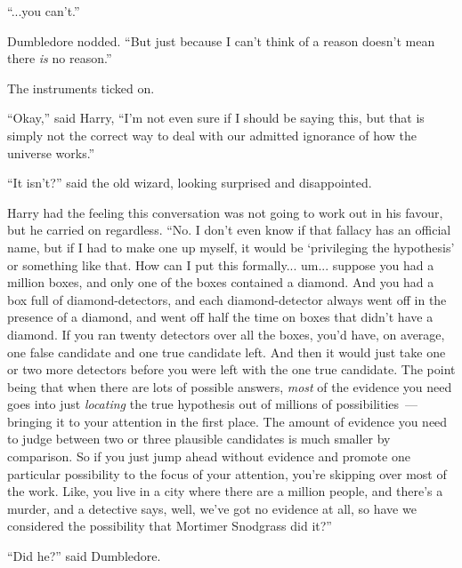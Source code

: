 ``...you can't.''

Dumbledore nodded. ``But just because I can't think of a reason doesn't mean there \emph{is} no reason.''

The instruments ticked on.

``Okay,'' said Harry, ``I'm not even sure if I should be saying this, but that is simply not the correct way to deal with our admitted ignorance of how the universe works.''

``It isn't?'' said the old wizard, looking surprised and disappointed.

Harry had the feeling this conversation was not going to work out in his favour, but he carried on regardless. ``No. I don't even know if that fallacy has an official name, but if I had to make one up myself, it would be `privileging the hypothesis' or something like that. How can I put this formally... um... suppose you had a million boxes, and only one of the boxes contained a diamond. And you had a box full of diamond-detectors, and each diamond-detector always went off in the presence of a diamond, and went off half the time on boxes that didn't have a diamond. If you ran twenty detectors over all the boxes, you'd have, on average, one false candidate and one true candidate left. And then it would just take one or two more detectors before you were left with the one true candidate. The point being that when there are lots of possible answers, \emph{most} of the evidence you need goes into just \emph{locating} the true hypothesis out of millions of possibilities~--- bringing it to your attention in the first place. The amount of evidence you need to judge between two or three plausible candidates is much smaller by comparison. So if you just jump ahead without evidence and promote one particular possibility to the focus of your attention, you're skipping over most of the work. Like, you live in a city where there are a million people, and there's a murder, and a detective says, well, we've got no evidence at all, so have we considered the possibility that Mortimer Snodgrass did it?''

``Did he?'' said Dumbledore.

